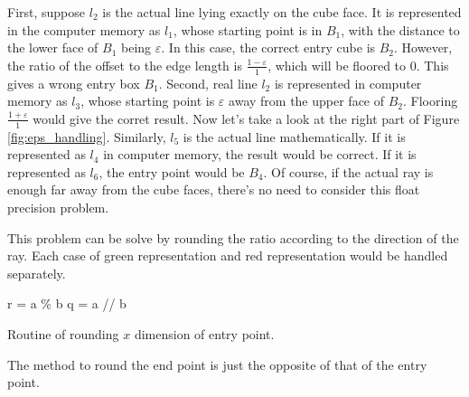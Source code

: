 First, suppose $l_2$ is the actual line lying exactly on the cube face. It is represented in the computer memory as $l_1$, whose starting point is in $B_1$, with the distance to the lower face of $B_1$ being $\varepsilon$. In this case, the correct entry cube is $B_2$. However, the ratio of the offset to the edge length is $\frac{1-\varepsilon}{1}$, which will be floored to 0. This gives a wrong entry box $B_1$. Second, real line $l_2$ is represented in computer memory as $l_3$, whose starting point is $\varepsilon$ away from the upper face of $B_2$. Flooring $\frac{1+\varepsilon}{1}$ would give the corret result. Now let's take a look at the right part of Figure \ref{fig:eps_handling}. Similarly, $l_5$ is the actual line mathematically. If it is represented as $l_4$ in computer memory, the result would be correct. If it is represented as $l_6$, the entry point would be $B_4$. Of course, if the actual ray is enough far away from the cube faces, there's no need to consider this float precision problem.

This problem can be solve by rounding the ratio according to the direction of the ray. Each case of green representation and red representation would be handled separately.

\IncMargin{1em}
\begin{algorithm}[H] \label{algo:properdivide}
    \DontPrintSemicolon
    r = a \% b\;
    q = a // b\;

    \caption{Routine of rounding $x$ dimension of entry point.}
\end{algorithm}
\DecMargin{1em}

The method to round the end point is just the opposite of that of the entry point.
